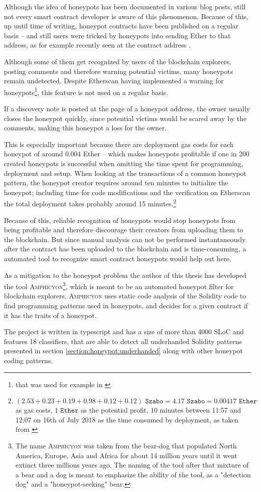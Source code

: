 Although the idea of honeypots has been documented in various blog posts, still not every smart contract developer is aware of this phenomenon. Because of this, up until time of writing, honeypot contracts have been published on a regular basis -- and still users were tricked by honeypots into sending Ether to that address, as for example recently seen at the contract address \cite{etherscan:latchedhoneypot}.

Although some of them get recognized by users of the blockchain explorers, posting comments and therefore warning potential victims, many honeypots remain undetected. Despite Etherscan having implemented a warning for honeypots\footnote{that was used for example in \cite{etherscan:uncalledcallhoneypot}}, this feature is not used on a regular basis.

If a discovery note is posted at the page of a honeypot address, the owner usually closes the honeypot quickly, since potential victims would be scared away by the comments, making this honeypot a loss for the owner.

This is especially important because there are deployment gas costs for each honeypot of around 0.004 Ether -- which makes honeypots profitable if one in 200 created honeypots is successful when omitting the time spent for programming, deployment and setup. When looking at the transactions of a common honeypot pattern, the honeypot creator requires around ten minutes to initialize the honeypot; including time for code modifications and the verification on Etherscan the total deployment takes probably around 15 minutes.\footnote{ \((2.53 + 0.23 + 0.19 + 0.98 + 0.12 + 0.12) \texttt{ Szabo} = 4.17 \texttt{ Szabo} = 0.00417 \texttt{ Ether} \) as gas costs, \( 1 \texttt{ Ether} \) as the potential profit, 10 minutes between 11:57 and 12:07 on 16th of July 2018 as the time consumed by deployment, as taken from \cite{etherchain:honeypot}}

Because of this, reliable recognition of honeypots would stop honeypots from being profitable and therefore discourage their creators from uploading them to the blockchain. But since manual analysis can not be performed instantaneously after the contract has been uploaded to the blockchain and is time-consuming, a automated tool to recognize smart contract honeypots would help out here.

As a mitigation to the honeypot problem the author of this thesis has developed the tool \textsc{Amphicyon}\footnote{The name \textsc{Amphicyon} was taken from the bear-dog that populated North America, Europe, Asia and Africa for about 14 million years until it went extinct three millions years ago. The naming of the tool after that mixture of a bear and a dog is meant to emphasize the ability of the tool, as a "detection dog" and a "honeypot-seeking" bear.}, which is meant to be an automated honeypot filter for blockchain explorers. \textsc{Amphicyon} uses static code analysis of the Solidity code to find programming patterns used in honeypots, and decides for a given contract if it has the traits of a honeypot.

The project is written in typescript and has a size of more than 4000 SLoC and features 18 classifiers, that are able to detect all underhanded Solidity patterns presented in section \ref{section:honeypot:underhanded} along with other honeypot coding patterns.
